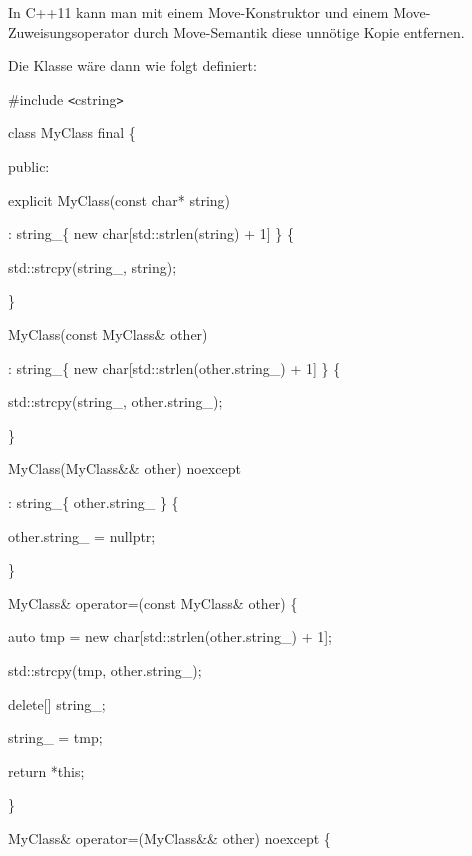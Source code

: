\documentclass{article}
\begin{document}
\vspace{12pt}
In C++11 kann man mit einem Move-Konstruktor und einem Move-Zuweisungsoperator 
durch Move-Semantik diese unnötige Kopie entfernen.

Die Klasse wäre dann wie folgt definiert:

\vspace{12pt}
\#include \texttt{<}cstring\texttt{>}

\vspace{12pt}
class MyClass final \{

public:    

\parindent=14pt
explicit MyClass(const char* string)        

\parindent=28pt
: string\_\{ new char[std::strlen(string) + 1] \} \{        

std::strcpy(string\_, string);    

\parindent=43pt
\}    

\vspace{12pt}
\parindent=14pt
MyClass(const MyClass\& other)        

\parindent=28pt
: string\_\{ new char[std::strlen(other.string\_) + 1] \} \{        

std::strcpy(string\_, other.string\_);    

\parindent=43pt
\}    

\vspace{12pt}
\parindent=14pt
MyClass(MyClass\&\& other) noexcept        

\parindent=28pt
: string\_\{ other.string\_ \} \{        

other.string\_ = nullptr;    

\parindent=43pt
\}    

\vspace{12pt}
\parindent=14pt
MyClass\& operator=(const MyClass\& other) \{        

\parindent=28pt
auto tmp = new char[std::strlen(other.string\_) + 1];        

std::strcpy(tmp, other.string\_);        

\parindent=57pt
delete[] string\_;        

\parindent=28pt
string\_ = tmp;        

return *this;    

\parindent=43pt
\}    

\vspace{12pt}
\parindent=14pt
MyClass\& operator=(MyClass\&\& other) noexcept \{        
\end{document}
